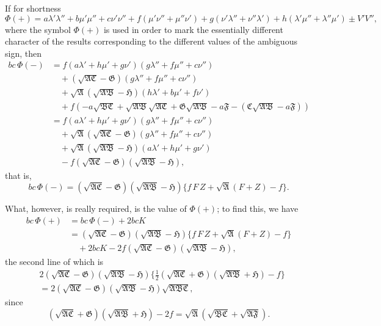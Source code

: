 \documentclass[11pt,a4paper]{book}
\begin{document}
If for shortness
\[
\Phi(+) = a\lambda'\lambda''+b\mu'\mu''+c\nu'\nu''+f(\mu'\nu''+\mu''\nu')+g(\nu'\lambda''+\nu''\lambda')+h(\lambda'\mu''+\lambda''\mu') \pm V'V'',
\]
where the symbol $\Phi(+)$ is used in order to mark the essentially different character of the results corresponding to the different values of the ambiguous sign, then
\begin{align*}
bc\,\Phi(-) &= f(a\lambda'+h\mu'+g\nu')(g\lambda''+f\mu''+c\nu'')\\
&\quad + (\sqrt{\mathfrak{A}\mathfrak{C}}-\mathfrak{G})(g\lambda''+f\mu''+c\nu'')\\
&\quad + \sqrt{\mathfrak{A}}(\sqrt{\mathfrak{A}\mathfrak{B}}-\mathfrak{H})(h\lambda'+b\mu'+f\nu')\\
&\quad + f(-a\sqrt{\mathfrak{B}\mathfrak{C}}+\sqrt{\mathfrak{A}\mathfrak{B}}\sqrt{\mathfrak{A}\mathfrak{C}}+\mathfrak{G}\sqrt{\mathfrak{A}\mathfrak{B}}-a\mathfrak{F}-(\mathfrak{C}\sqrt{\mathfrak{A}\mathfrak{B}}-a\mathfrak{F}))\\
&= f(a\lambda'+h\mu'+g\nu')(g\lambda''+f\mu''+c\nu'')\\
&\quad + \sqrt{\mathfrak{A}}(\sqrt{\mathfrak{A}\mathfrak{C}}-\mathfrak{G})(g\lambda''+f\mu''+c\nu'')\\
&\quad + \sqrt{\mathfrak{A}}(\sqrt{\mathfrak{A}\mathfrak{B}}-\mathfrak{H})(a\lambda'+h\mu'+g\nu')\\
&\quad - f(\sqrt{\mathfrak{A}\mathfrak{C}}-\mathfrak{G})(\sqrt{\mathfrak{A}\mathfrak{B}}-\mathfrak{H}),
\end{align*}
that is,
\[
bc\,\Phi(-) = (\sqrt{\mathfrak{A}\mathfrak{C}}-\mathfrak{G})(\sqrt{\mathfrak{A}\mathfrak{B}}-\mathfrak{H})\{f\,F\,Z + \sqrt{\mathfrak{A}}(F+Z)-f\}.
\]

What, however, is really required, is the value of $\Phi(+)$; to find this, we have
\begin{align*}
bc\,\Phi(+) &= bc\,\Phi(-) + 2bcK\\
&= (\sqrt{\mathfrak{A}\mathfrak{C}}-\mathfrak{G})(\sqrt{\mathfrak{A}\mathfrak{B}}-\mathfrak{H})\{f\,F\,Z + \sqrt{\mathfrak{A}}(F+Z)-f\}\\
&\quad + 2bcK - 2f(\sqrt{\mathfrak{A}\mathfrak{C}}-\mathfrak{G})(\sqrt{\mathfrak{A}\mathfrak{B}}-\mathfrak{H}),
\end{align*}
the second line of which is
\begin{align*}
&2(\sqrt{\mathfrak{A}\mathfrak{C}}-\mathfrak{G})(\sqrt{\mathfrak{A}\mathfrak{B}}-\mathfrak{H})\{\tfrac{1}{2}(\sqrt{\mathfrak{A}\mathfrak{C}}+\mathfrak{G})(\sqrt{\mathfrak{A}\mathfrak{B}}+\mathfrak{H})-f\}\\
&= 2(\sqrt{\mathfrak{A}\mathfrak{C}}-\mathfrak{G})(\sqrt{\mathfrak{A}\mathfrak{B}}-\mathfrak{H})\sqrt{\mathfrak{A}\mathfrak{B}\mathfrak{C}},
\end{align*}
since
\[
(\sqrt{\mathfrak{A}\mathfrak{C}}+\mathfrak{G})(\sqrt{\mathfrak{A}\mathfrak{B}}+\mathfrak{H}) - 2f = \sqrt{\mathfrak{A}}(\sqrt{\mathfrak{B}\mathfrak{C}}+\sqrt{\mathfrak{A}\mathfrak{F}}).
\]
\end{document}
